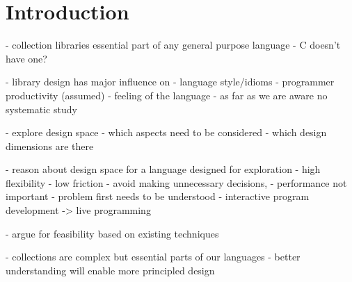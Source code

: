 \documentclass[sigconf, 10pt]{acmart}
\begin{document}
\maketitle


\section{Introduction}



\begin{note}
- collection libraries
  essential part of any general purpose language
  - C doesn't have one?

- library design has major influence on
  - language style/idioms
  - programmer productivity (assumed)
  - feeling of the language
- as far as we are aware no systematic study

- explore design space
  - which aspects need to be considered
  - which design dimensions are there


- reason about design space for a language designed for exploration
 - high flexibility
 - low friction
   - avoid making unnecessary decisions,
   - performance not important
   - problem first needs to be understood
 - interactive program development
 -> live programming

- argue for feasibility based on existing techniques

- collections are complex but essential parts of our languages
  - better understanding will enable more principled design

\end{note}
\end{document}
